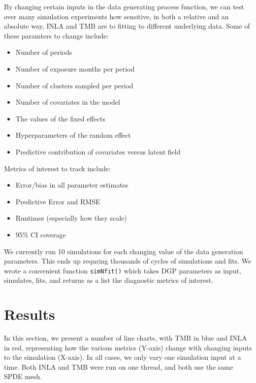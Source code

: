 \documentclass[12pt]{article}
\begin{document}
By changing certain inputs in the data generating process function, we can test over many simulation experiments how sensitive, in both a relative and an absolute way, INLA and TMB are to fitting to different underlying data. Some of these paramters to change include:

\begin{itemize}

  \item Number of periods
  \item Number of exposure months per period
  \item Number of clusters sampled per period
  \item Number of covariates in the model
  \item The values of the fixed effects
  \item Hyperparameters of the random effect
  \item Predictive contribution of covariates versus latent field

\end{itemize}


Metrics of interest to track include:

\begin{itemize}

  \item Error/bias in all parameter estimates 
  \item Predictive Error and RMSE
  \item Runtimes (especially how they scale)
  \item 95\% CI coverage

\end{itemize}

We currently run 10 simulations for each changing value of the data generation parameters. This ends up requring thousands of cycles of simulations and fits. We wrote a convenient function \texttt{simNfit()} which takes DGP parameters as input, simulates, fits, and returns as a list the diagnostic metrics of interest. 





\section{Results}

In this section, we present a number of line charts, with TMB in blue and INLA in red, representing how the various metrics (Y-axis) change with changing inputs to the simulation (X-axis). In all cases, we only vary one simulation input at a time. Both INLA and TMB were run on one thread, and both use the same SPDE mesh. 
\end{document}

